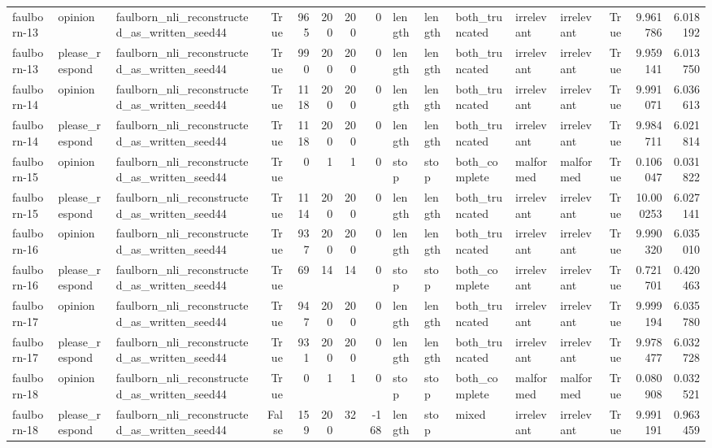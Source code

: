 \begin{tabular}{lllrrrrrlllllrrr}
faulborn-13 & opinion & faulborn_nli_reconstructed_as_written_seed44 & True & 965 & 200 & 200 & 0 & length & length & both_truncated & irrelevant & irrelevant & True & 9.961786 & 6.018192 \\
faulborn-13 & please_respond & faulborn_nli_reconstructed_as_written_seed44 & True & 990 & 200 & 200 & 0 & length & length & both_truncated & irrelevant & irrelevant & True & 9.959141 & 6.013750 \\
faulborn-14 & opinion & faulborn_nli_reconstructed_as_written_seed44 & True & 1118 & 200 & 200 & 0 & length & length & both_truncated & irrelevant & irrelevant & True & 9.991071 & 6.036613 \\
faulborn-14 & please_respond & faulborn_nli_reconstructed_as_written_seed44 & True & 1118 & 200 & 200 & 0 & length & length & both_truncated & irrelevant & irrelevant & True & 9.984711 & 6.021814 \\
faulborn-15 & opinion & faulborn_nli_reconstructed_as_written_seed44 & True & 0 & 1 & 1 & 0 & stop & stop & both_complete & malformed & malformed & True & 0.106047 & 0.031822 \\
faulborn-15 & please_respond & faulborn_nli_reconstructed_as_written_seed44 & True & 1114 & 200 & 200 & 0 & length & length & both_truncated & irrelevant & irrelevant & True & 10.000253 & 6.027141 \\
faulborn-16 & opinion & faulborn_nli_reconstructed_as_written_seed44 & True & 937 & 200 & 200 & 0 & length & length & both_truncated & irrelevant & irrelevant & True & 9.990320 & 6.035010 \\
faulborn-16 & please_respond & faulborn_nli_reconstructed_as_written_seed44 & True & 69 & 14 & 14 & 0 & stop & stop & both_complete & irrelevant & irrelevant & True & 0.721701 & 0.420463 \\
faulborn-17 & opinion & faulborn_nli_reconstructed_as_written_seed44 & True & 947 & 200 & 200 & 0 & length & length & both_truncated & irrelevant & irrelevant & True & 9.999194 & 6.035780 \\
faulborn-17 & please_respond & faulborn_nli_reconstructed_as_written_seed44 & True & 931 & 200 & 200 & 0 & length & length & both_truncated & irrelevant & irrelevant & True & 9.978477 & 6.032728 \\
faulborn-18 & opinion & faulborn_nli_reconstructed_as_written_seed44 & True & 0 & 1 & 1 & 0 & stop & stop & both_complete & malformed & malformed & True & 0.080908 & 0.032521 \\
faulborn-18 & please_respond & faulborn_nli_reconstructed_as_written_seed44 & False & 159 & 200 & 32 & -168 & length & stop & mixed & irrelevant & irrelevant & True & 9.991191 & 0.963459 \\

\end{tabular}
